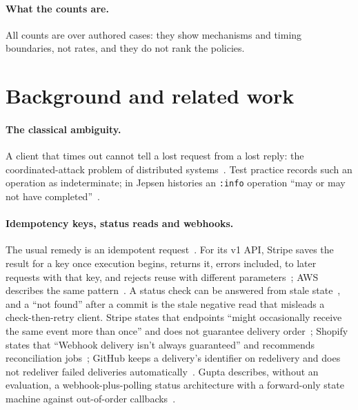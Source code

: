 \documentclass[11pt]{article}
\newcommand{\code}[1]{\texttt{#1}}
\begin{document}
\paragraph{What the counts are.} All counts are over authored cases: they show mechanisms and timing boundaries, not rates, and they do not rank the policies.

\section{Background and related work}\label{sec:related}

\paragraph{The classical ambiguity.} A client that times out cannot tell a lost request from a lost reply: the coordinated-attack problem of distributed systems~\cite{akkoyunlu,gray}. Test practice records such an operation as indeterminate; in Jepsen histories an \code{:info} operation ``may or may not have completed''~\cite{jepsen}.

\paragraph{Idempotency keys, status reads and webhooks.} The usual remedy is an idempotent request~\cite{helland}. For its v1 API, Stripe saves the result for a key once execution begins, returns it, errors included, to later requests with that key, and rejects reuse with different parameters~\cite{stripeidem}; AWS describes the same pattern~\cite{aws}. A status check can be answered from stale state~\cite{vogels}, and a ``not found'' after a commit is the stale negative read that misleads a check-then-retry client. Stripe states that endpoints ``might occasionally receive the same event more than once'' and does not guarantee delivery order~\cite{stripewebhooks}; Shopify states that ``Webhook delivery isn't always guaranteed'' and recommends reconciliation jobs~\cite{shopify}; GitHub keeps a delivery's identifier on redelivery and does not redeliver failed deliveries automatically~\cite{github}. Gupta describes, without an evaluation, a webhook-plus-polling status architecture with a forward-only state machine against out-of-order callbacks~\cite{gupta}.
\end{document}
